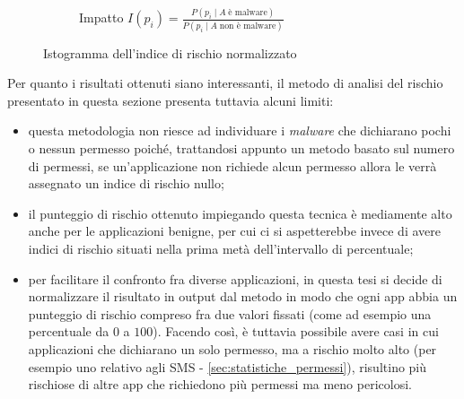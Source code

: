 \documentclass[12pt,a4paper,oneside]{article}
\begin{document}
\begin{figure}[!htb]
\begin{subfigure}[t]{.49\textwidth}
        \caption{Impatto $I\left(p_i\right) = \frac{P\left(p_i \mid A\;\text{è malware}\right)}{P\left(p_i \mid A\;\text{non è malware}\right)}$}
    \end{subfigure}%
    \vspace{.01\textwidth}
    \captionsetup{justification=centering}
    \caption{Istogramma dell'indice di rischio normalizzato}\label{fig:istogramma}
\end{figure}

\noindent Per quanto i risultati ottenuti siano interessanti, il metodo di analisi del rischio presentato in questa sezione presenta tuttavia alcuni limiti:
\begin{itemize}
    \item questa metodologia non riesce ad individuare i \textit{malware} che dichiarano pochi o nessun permesso poiché, trattandosi appunto un metodo basato sul numero di permessi, se un'applicazione non richiede alcun permesso allora le verrà assegnato un indice di rischio nullo;
    \item il punteggio di rischio ottenuto impiegando questa tecnica è mediamente alto anche per le applicazioni benigne, per cui ci si aspetterebbe invece di avere indici di rischio situati nella prima metà dell'intervallo di percentuale;
    \item per facilitare il confronto fra diverse applicazioni, in questa tesi si decide di normalizzare il risultato in output dal metodo in modo che ogni app abbia un punteggio di rischio compreso fra due valori fissati (come ad esempio una percentuale da $0$ a $100$). Facendo così, è tuttavia possibile avere casi in cui applicazioni che dichiarano un solo permesso, ma a rischio molto alto (per esempio uno relativo agli SMS - \cref{sec:statistiche_permessi}), risultino più rischiose di altre app che richiedono più permessi ma meno pericolosi.
\end{itemize}
\end{document}

